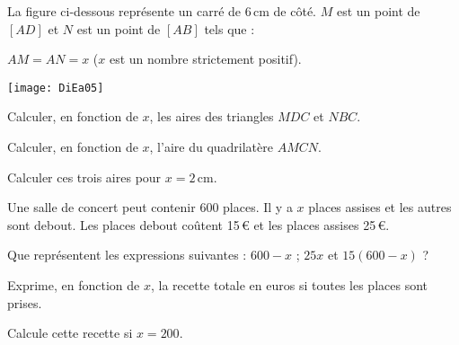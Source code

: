 \begin{exercice}[] 
La figure ci-dessous représente un carré de 6\,cm de côté. $M$ est un point de $[AD]$ et $N$ est un point de $[AB]$ tels que : 

$AM = AN = x$ ($x$ est un nombre strictement positif).

    \begin{center}
    \texttt{[image: DiEa05]}
    \end{center}

\begin{colenumerate}{1} 
\item Calculer, en fonction de $x$, les aires des triangles $MDC$ et $NBC$.
\item Calculer, en fonction de $x$, l'aire du quadrilatère $AMCN$.
\item Calculer ces trois aires pour $x = 2$\,cm. 
\end{colenumerate} 
\end{exercice}




\begin{exercice}[]
Une salle de concert peut contenir 600 places. Il y a $x$ places assises et les autres sont debout. Les places debout coûtent 15\,€ et les places assises 25\,€.

\begin{colenumerate}{1} 
\item Que représentent les expressions suivantes : $600 -x$ ; $25x$ et $15(600 -x)$ ?
\item Exprime, en fonction de $x$, la recette totale en euros si toutes les places sont prises.
\item Calcule cette recette si $x = 200$.
\end{colenumerate}
\end{exercice}
